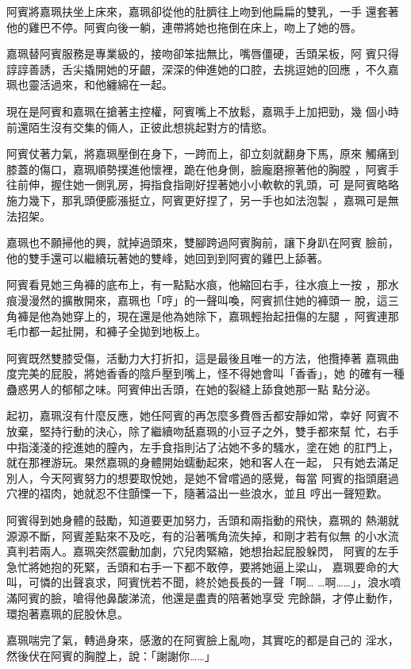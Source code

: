 阿賓將嘉珮扶坐上床來，嘉珮卻從他的肚臍往上吻到他扁扁的雙乳，一手
還套著他的雞巴不停。阿賓向後一躺，連帶將她也拖倒在床上，吻上了她的唇。

嘉珮替阿賓服務是專業級的，接吻卻笨拙無比，嘴唇僵硬，舌頭呆板，阿
賓只得諄諄善誘，舌尖撬開她的牙齦，深深的伸進她的口腔，去挑逗她的回應
，不久嘉珮也靈活過來，和他纏綿在一起。

現在是阿賓和嘉珮在搶著主控權，阿賓嘴上不放鬆，嘉珮手上加把勁，幾
個小時前還陌生沒有交集的倆人，正彼此想挑起對方的情慾。

阿賓仗著力氣，將嘉珮壓倒在身下，一跨而上，卻立刻就翻身下馬，原來
觸痛到膝蓋的傷口，嘉珮順勢撲進他懷裡，跪在他身側，臉龐磨擦著他的胸膛
，阿賓手往前伸，握住她一側乳房，拇指食指剛好捏著她小小軟軟的乳頭，可
是阿賓略略施力幾下，那乳頭便膨漲挺立，阿賓更好捏了，另一手也如法泡製
，嘉珮可是無法招架。

嘉珮也不願掃他的興，就掉過頭來，雙腳跨過阿賓胸前，讓下身趴在阿賓
臉前，他的雙手還可以繼續玩著她的雙峰，她回到到阿賓的雞巴上舔著。

阿賓看見她三角褲的底布上，有一點點水痕，他縮回右手，往水痕上一按
，那水痕漫漫然的擴散開來，嘉珮也「哼」的一聲叫喚，阿賓抓住她的褲頭一
脫，這三角褲是他為她穿上的，現在還是他為她除下，嘉珮輕抬起扭傷的左腿
，阿賓連那毛巾都一起扯開，和褲子全拋到地板上。

阿賓既然雙膝受傷，活動力大打折扣，這是最後且唯一的方法，他攬捧著
嘉珮曲度完美的屁股，將她香香的陰戶壓到嘴上，怪不得她會叫「香香」，她
的確有一種蠱惑男人的郁郁之味。阿賓伸出舌頭，在她的裂縫上舔食她那一點
點分泌。

起初，嘉珮沒有什麼反應，她任阿賓的再怎麼多費唇舌都安靜如常，幸好
阿賓不放棄，堅持行動的決心，除了繼續吻舐嘉珮的小豆子之外，雙手都來幫
忙，右手中指淺淺的挖進她的膣內，左手食指則沾了沾她不多的騷水，塗在她
的肛門上，就在那裡游玩。果然嘉珮的身體開始蠕動起來，她和客人在一起，
只有她去滿足別人，今天阿賓努力的想要取悅她，是她不曾嚐過的感覺，每當
阿賓的指頭磨過穴裡的褶肉，她就忍不住顫慄一下，隨著溢出一些浪水，並且
哼出一聲短歎。

阿賓得到她身體的鼓勵，知道要更加努力，舌頭和兩指動的飛快，嘉珮的
熱潮就源源不斷，阿賓差點來不及吃，有的沿著嘴角流失掉，和剛才若有似無
的小水流真判若兩人。嘉珮突然震動加劇，穴兒肉緊縮，她想抬起屁股躲閃，
阿賓的左手急忙將她抱的死緊，舌頭和右手一下都不敢停，要將她逼上梁山，
嘉珮要命的大叫，可憐的出聲哀求，阿賓恍若不聞，終於她長長的一聲「啊…
…啊……」，浪水噴滿阿賓的臉，嗆得他鼻酸涕流，他還是盡責的陪著她享受
完餘韻，才停止動作，環抱著嘉珮的屁股休息。

嘉珮喘完了氣，轉過身來，感激的在阿賓臉上亂吻，其實吃的都是自己的
淫水，然後伏在阿賓的胸膛上，說：「謝謝你……」

